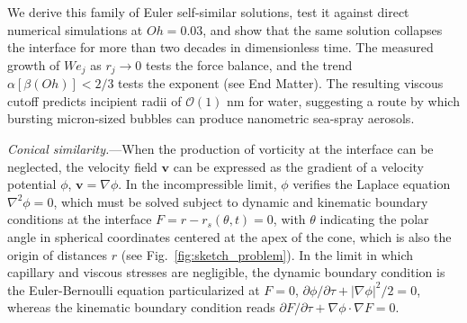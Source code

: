 \documentclass[twocolumn]{revtex4-2}
\begin{document}
We derive this family of Euler self-similar solutions, test it against direct numerical simulations at $Oh=0.03$, and show that the same solution collapses the interface for more than two decades in dimensionless time. The measured growth of $We_j$ as $r_j \to 0$ tests the force balance, and the trend $\alpha[\beta(Oh)]<2/3$ tests the exponent (see End Matter). The resulting viscous cutoff predicts incipient radii of $\mathcal{O}(1)$ nm for water, suggesting a route by which bursting micron-sized bubbles can produce nanometric sea-spray aerosols.


\emph{Conical similarity.}---When the production of vorticity at the interface can be neglected, the velocity field $\mathbf{v}$ can be expressed as the gradient of a velocity potential $\phi$, $\mathbf{v}=\nabla\phi$. In the incompressible limit, $\phi$ verifies the Laplace equation $\nabla^2\phi=0$, which must be solved subject to dynamic and kinematic boundary conditions at the interface $F=r-r_s(\theta,t)=0$, with $\theta$ indicating the polar angle in spherical coordinates centered at the apex of the cone, which is also the origin of distances $r$ (see Fig.~\ref{fig:sketch_problem}). In the limit in which capillary and viscous stresses are negligible, the dynamic boundary condition is the Euler-Bernoulli equation particularized at $F=0$, $\partial\phi/\partial \tau+|\nabla\phi|^2/2=0$, whereas the kinematic boundary condition reads $\partial F/\partial \tau+\nabla\phi\cdot\nabla F=0$.
\end{document}
